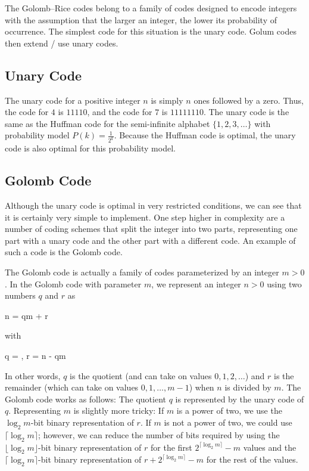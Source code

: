 
The Golomb–Rice codes belong to a family of codes designed to encode integers with the assumption that the larger an integer, the lower its probability of occurrence. The simplest code for this situation is the unary code. Golum codes then extend / use unary codes.

\subsection{Unary Code}

The unary code for a positive integer $n$ is simply $n$ ones followed by a zero. Thus, the code for $4$ is $11110$, and the code for $7$ is $11111110$. The unary code is the same as the Huffman code for the semi-infinite alphabet $\{1, 2, 3, \ldots \}$ with probability model $P(k) = \frac{1}{2^k}$. Because the Huffman code is optimal, the unary code is also optimal for this probability model.

\subsection{Golomb Code}

Although the unary code is optimal in very restricted conditions, we can see that it is certainly very simple to implement. One step higher in complexity are a number of coding schemes that split the integer into two parts, representing one part with a unary code and the other part with a different code. An example of such a code is the Golomb code.

The Golomb code is actually a family of codes parameterized by an integer $m > 0$. In the Golomb code with parameter $m$, we represent an integer $n > 0$ using two numbers $q$ and $r$ as

\bee
n = qm + r
\eee

with

\bee
q = \left\lfloor {} \right\rfloor, \qquad r = n - qm
\eee


In other words, $q$ is the quotient (and can take on values $0, 1, 2, \ldots$) and $r$ is the remainder (which can take on values $0, 1, \ldots, m-1$) when $n$ is divided by $m$. The Golomb code works as follows: The quotient $q$ is represented by the unary code of $q$. Representing $m$ is slightly more tricky: If $m$ is a power of two, we use the $\log_2 m$-bit binary representation of $r$. If $m$ is not a power of two, we could use $\lceil \log_2 m \rceil$; however, we can reduce the number of bits required by using the $\lfloor \log_2 m \rfloor$-bit binary representation of $r$ for the first $2^{\lceil \log_2 m \rceil} - m$ values and the $\lceil \log_2 m \rceil$-bit binary representation of $r + 2^{\lceil \log_2 m \rceil} - m$ for the rest of the values.

